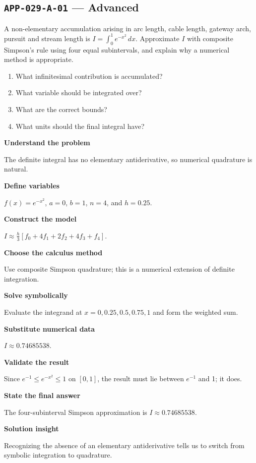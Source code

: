 \documentclass[11pt]{book}
\newcommand{\pid}[1]{\texttt{#1}}
\begin{document}
\subsection*{\pid{APP-029-A-01} — Advanced}
\begin{problembox}
A non-elementary accumulation arising in arc length, cable length, gateway arch, pursuit and stream length is $I=\int_0^1 e^{-x^2}\,dx$. Approximate $I$ with composite Simpson's rule using four equal subintervals, and explain why a numerical method is appropriate.
\end{problembox}
\begin{promptbox}\begin{enumerate}
\item What infinitesimal contribution is accumulated?
\item What variable should be integrated over?
\item What are the correct bounds?
\item What units should the final integral have?
\end{enumerate}\end{promptbox}
\begin{solutionbox}
\textbf{Understand the problem}\par The definite integral has no elementary antiderivative, so numerical quadrature is natural.\par\medskip
\textbf{Define variables}\par $f(x)=e^{-x^2}$, $a=0$, $b=1$, $n=4$, and $h=0.25$.\par\medskip
\textbf{Construct the model}\par $I\approx\frac{h}{3}[f_0+4f_1+2f_2+4f_3+f_4]$.\par\medskip
\textbf{Choose the calculus method}\par Use composite Simpson quadrature; this is a numerical extension of definite integration.\par\medskip
\textbf{Solve symbolically}\par Evaluate the integrand at $x=0,0.25,0.5,0.75,1$ and form the weighted sum.\par\medskip
\textbf{Substitute numerical data}\par $I\approx 0.74685538$.\par\medskip
\textbf{Validate the result}\par Since $e^{-1}\le e^{-x^2}\le1$ on $[0,1]$, the result must lie between $e^{-1}$ and 1; it does.\par\medskip
\textbf{State the final answer}\par The four-subinterval Simpson approximation is $I\approx 0.74685538$.\par\medskip
\textbf{Solution insight}\par Recognizing the absence of an elementary antiderivative tells us to switch from symbolic integration to quadrature.\par\medskip
\end{solutionbox}
\end{document}
